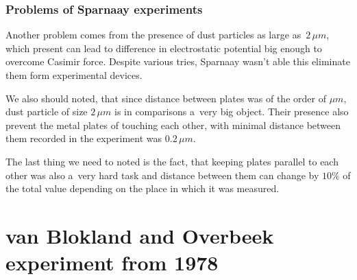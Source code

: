 \documentclass[10pt,t]{beamer}
\begin{document}
\begin{frame}
  \frametitle{Problems of Sparnaay experiments}


  Another problem comes from the presence of dust particles as large
  as~$2 \, \mu\si{m}$, which present can lead to difference in electrostatic
  potential big enough to overcome Casimir force. Despite various tries,
  Sparnaay wasn't able this eliminate them form experimental devices.

  We also should noted, that since distance between plates was of the order
  of $\mu\si{m}$, dust particle of size $2 \, \mu\si{m}$ is in
  comparisons a~very big object. Their presence also prevent the metal
  plates of touching each other, with minimal distance between them
  recorded in the experiment was $0.2 \, \mu\si{m}$.

  The last thing we need to noted is the fact, that keeping plates parallel
  to each other was also a~very hard task and distance between them can
  change by $10\%$ of the total value depending on the place in which it
  was measured.

\end{frame}










\section{van Blokland and Overbeek experiment from 1978}
\end{document}
